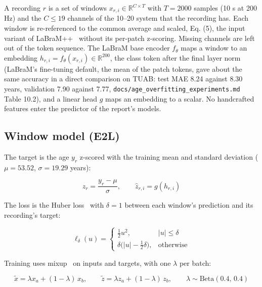 \documentclass[11pt,a4paper]{article}
\begin{document}
A recording $r$ is a set of windows $x_{r,i} \in \mathbb{R}^{C \times T}$ with $T = 2000$ samples (10 s at 200 Hz) and the $C \le 19$ channels of the 10--20 system that the recording has. Each window is re-referenced to the common average and scaled, Eq. (5), the input variant of LaBraM++~\citep{barmpas2025labrampp} without its per-patch z-scoring. Missing channels are left out of the token sequence. The LaBraM base encoder $f_\theta$ maps a window to an embedding $h_{r,i} = f_\theta(x_{r,i}) \in \mathbb{R}^{200}$, the class token after the final layer norm (LaBraM's fine-tuning default, the mean of the patch tokens, gave about the same accuracy in a direct comparison on TUAB: test MAE 8.24 against 8.30 years, validation 7.90 against 7.77, \texttt{docs/age\_overfitting\_experiments.md} Table 10.2), and a linear head $g$ maps an embedding to a scalar. No handcrafted features enter the predictor of the report's models.

\subsection{Window model (E2L)}

The target is the age $y_r$ z-scored with the training mean and standard deviation ($\mu = 53.52$, $\sigma = 19.29$ years):

\begin{equation}
z_r = \frac{y_r - \mu}{\sigma}, \qquad \hat z_{r,i} = g(h_{r,i}) \tag{6}
\end{equation}

The loss is the Huber loss~\citep{huber1964robust} with $\delta = 1$ between each window's prediction and its recording's target:

\begin{equation}
\ell_\delta(u) = \begin{cases} \frac{1}{2} u^2, & \lvert u \rvert \le \delta \\ \delta \big(\lvert u \rvert - \frac{1}{2}\delta\big), & \text{otherwise} \end{cases} \tag{7}
\end{equation}

Training uses mixup~\citep{zhang2017mixup} on inputs and targets, with one $\lambda$ per batch:

\begin{equation}
\tilde x = \lambda x_a + (1-\lambda)\,x_b, \qquad \tilde z = \lambda z_a + (1-\lambda)\,z_b, \qquad \lambda \sim \mathrm{Beta}(0.4,\,0.4) \tag{8}
\end{equation}
\end{document}
